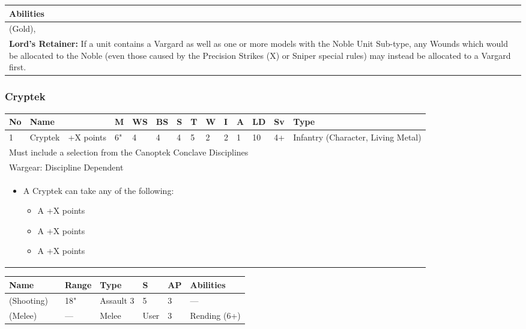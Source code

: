 \noindent
\begin{tabular}{||m{532pt}||}
	\hline
	Abilities \\
	\hline
	\quickref{Awakening Protocols}(Gold), \quickref{Reanimation Protocols} \\
	\textbf{Lord's Retainer:} If a unit contains a Vargard as well as one or more models with the Noble Unit Sub-type, any Wounds which would be allocated to the Noble (even those caused by the Precision Strikes (X) or Sniper special rules) may instead	be allocated to a Vargard first. \\
	\hline
\end{tabular}


\newpage
\subsubsection{Cryptek}

\noindent
\begin{tabular}{||m{10pt} m{90pt} m{30pt} m{11pt} m{11pt} m{11pt} m{11pt} m{11pt} m{11pt} m{11pt} m{11pt} m{11pt} m{11pt} m{135pt}||}
	\hline
	No & Name & & M & WS & BS & S & T & W & I & A & LD & Sv & Type \\
	\hline
	1 & Cryptek & +X points & 6" & 4 & 4 & 4 & 5 & 2 & 2 & 1 & 10 & 4+ & Infantry (Character, Living Metal)\\
	\hline
	\hline
	\multicolumn{14}{||Z{532 pt}||}{Must include a selection from the Canoptek Conclave Disciplines}\\
	\hline
	\hline
	\multicolumn{14}{||Z{532 pt}||}{Wargear: Discipline Dependent} \\		
	\multicolumn{14}{||Z{532 pt}||}{\begin{itemize}
			\item A Cryptek can take any of the following:
			\begin{itemize}
				\item A \quickref{Mindshackle Scarabs} \hrulefill +X points
				\item A \quickref{Phase Shifter} \hrulefill +X points
				\item A \quickref{Phylactery} \hrulefill +X points
			\end{itemize}
	\end{itemize}} \\	
	\hline
\end{tabular}

\noindent
\begin{tabular}{||m{110pt} m{30pt} m{31pt} m{55pt} m{12pt} m{12pt} m{210pt}||}
	\hline
	Name & & Range & Type & S & AP & Abilities \\
	\hline
	\quickref{Staff of Light} (Shooting) & & 18" & Assault 3 & 5 & 3 & — \\
	\quickref{Staff of Light} (Melee) & & — & Melee & User & 3 & Rending (6+) \\
	\hline
\end{tabular}

